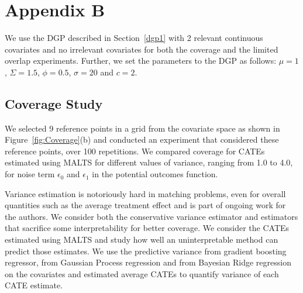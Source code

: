 \section*{Appendix B}
\label{sec:var_overlap}
We use the DGP described in Section~\ref{dgp1} with 2 relevant continuous covariates and no irrelevant covariates for both the coverage and the limited overlap experiments. Further, we set the parameters to the DGP as follows:
$\mu = 1$, $\Sigma = 1.5$, $\phi=0.5$, $\sigma = 20$ and $c = 2$.
\subsection*{Coverage Study}
We selected 9 reference points in a grid from the covariate space as shown in Figure~\ref{fig:Coverage}(b) and conducted an experiment that considered these reference points, over 100 repetitions. We compared coverage for CATEs estimated using MALTS for different values of variance, ranging from 1.0 to 4.0, for noise term $\epsilon_0$ and $\epsilon_1$ in the potential outcomes function. 

Variance estimation is notoriously hard in matching problems, even for overall quantities such as the average treatment effect \citep{doi:10.1111/j.1468-0262.2006.00655.x} and is part of ongoing work for the authors. We consider both the conservative variance estimator \citep{wang2017flame} and estimators that sacrifice some interpretability for better coverage. We consider the CATEs estimated using MALTS and study how well an uninterpretable method can predict those estimates. We use the predictive variance from gradient boosting regressor, from Gaussian Process regression and from Bayesian Ridge regression on the covariates and estimated average CATEs to quantify variance of each CATE estimate.

